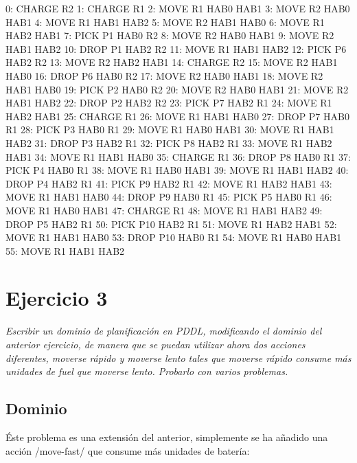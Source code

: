 \documentclass[	DIV=calc,%
							paper=a4,%
							fontsize=11pt]{scrartcl}	 					%
\begin{document}
\begin{bashcode}
	        0: CHARGE R2
	        1: CHARGE R1
	        2: MOVE R1 HAB0 HAB1
	        3: MOVE R2 HAB0 HAB1
	        4: MOVE R1 HAB1 HAB2
	        5: MOVE R2 HAB1 HAB0
	        6: MOVE R1 HAB2 HAB1
	        7: PICK P1 HAB0 R2
	        8: MOVE R2 HAB0 HAB1
	        9: MOVE R2 HAB1 HAB2
	       10: DROP P1 HAB2 R2
	       11: MOVE R1 HAB1 HAB2
	       12: PICK P6 HAB2 R2
	       13: MOVE R2 HAB2 HAB1
	       14: CHARGE R2
	       15: MOVE R2 HAB1 HAB0
	       16: DROP P6 HAB0 R2
	       17: MOVE R2 HAB0 HAB1
	       18: MOVE R2 HAB1 HAB0
	       19: PICK P2 HAB0 R2
	       20: MOVE R2 HAB0 HAB1
	       21: MOVE R2 HAB1 HAB2
	       22: DROP P2 HAB2 R2
	       23: PICK P7 HAB2 R1
	       24: MOVE R1 HAB2 HAB1
	       25: CHARGE R1
	       26: MOVE R1 HAB1 HAB0
	       27: DROP P7 HAB0 R1
	       28: PICK P3 HAB0 R1
	       29: MOVE R1 HAB0 HAB1
	       30: MOVE R1 HAB1 HAB2
	       31: DROP P3 HAB2 R1
	       32: PICK P8 HAB2 R1
	       33: MOVE R1 HAB2 HAB1
	       34: MOVE R1 HAB1 HAB0
	       35: CHARGE R1
	       36: DROP P8 HAB0 R1
	       37: PICK P4 HAB0 R1
	       38: MOVE R1 HAB0 HAB1
	       39: MOVE R1 HAB1 HAB2
	       40: DROP P4 HAB2 R1
	       41: PICK P9 HAB2 R1
	       42: MOVE R1 HAB2 HAB1
	       43: MOVE R1 HAB1 HAB0
	       44: DROP P9 HAB0 R1
	       45: PICK P5 HAB0 R1
	       46: MOVE R1 HAB0 HAB1
	       47: CHARGE R1
	       48: MOVE R1 HAB1 HAB2
	       49: DROP P5 HAB2 R1
	       50: PICK P10 HAB2 R1
	       51: MOVE R1 HAB2 HAB1
	       52: MOVE R1 HAB1 HAB0
	       53: DROP P10 HAB0 R1
	       54: MOVE R1 HAB0 HAB1
	       55: MOVE R1 HAB1 HAB2
\end{bashcode}

\section{Ejercicio 3}
\label{sec:Ejercicio 3}

\textit{Escribir un dominio de planificación en PDDL, modificando el dominio del anterior
ejercicio, de manera que se puedan utilizar ahora dos acciones diferentes, moverse
rápido y moverse lento tales que moverse rápido consume más unidades de fuel que
moverse lento. Probarlo con varios problemas.}

\subsection{Dominio}
\label{sub:Dominio}

Éste problema es una extensión del anterior, simplemente se ha añadido una acción \newlispinline/move-fast/ que consume más unidades de batería:
\end{document}
